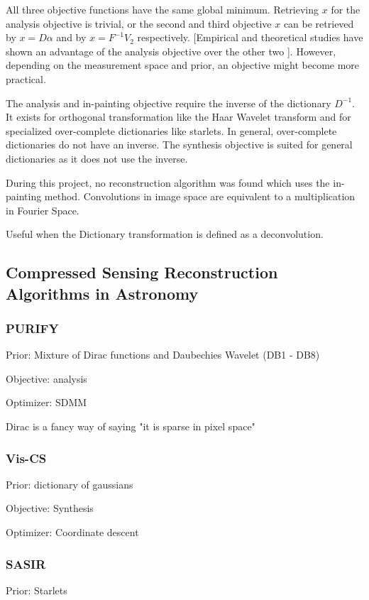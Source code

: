 All three objective functions have the same global minimum. Retrieving $x$ for the analysis objective is trivial, or the second and third objective $x$ can be retrieved by $x = D\alpha$ and by $x = F^{-1}V_2$ respectively. [Empirical and theoretical studies have shown an advantage of the analysis objective over the other two \cite{something}]. However, depending on the measurement space and prior, an objective might become more practical. 

The analysis and in-painting objective require the inverse of the dictionary $D^{-1}$. It exists for orthogonal transformation like the Haar Wavelet transform and for specialized over-complete dictionaries like starlets. In general, over-complete dictionaries do not have an inverse. The synthesis objective is suited for general dictionaries as it does not use the inverse.

During this project, no reconstruction algorithm was found which uses the in-painting method. 
Convolutions in image space are equivalent to a multiplication in Fourier Space.

Useful when the Dictionary transformation is defined as a deconvolution.

\subsection{Compressed Sensing Reconstruction Algorithms in Astronomy}


\subsubsection{PURIFY}
Prior: Mixture of Dirac functions and Daubechies Wavelet (DB1 - DB8)

Objective: analysis

Optimizer: SDMM

Dirac is a fancy way of saying "it is sparse in pixel space"


\subsubsection{Vis-CS}
Prior: dictionary of gaussians

Objective: Synthesis

Optimizer: Coordinate descent


\subsubsection{SASIR}
Prior: Starlets


